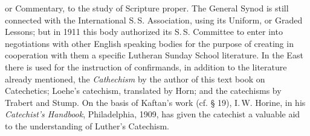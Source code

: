 or Commentary, to the study of Scripture proper. The General Synod is still connected with the International S.\,S. Association, using its Uniform, or Graded Lessons; but in 1911 this body authorized its S.\,S. Committee to enter into negotiations with other English speaking bodies for the purpose of creating in cooperation with them a specific Lutheran Sunday School literature. In the East there is used for the instruction of confirmands, in addition to the literature already mentioned, the \emph{Cathechism} by the author of this text book on Catechetics; Loehe’s catechism, translated by Horn; and the catechisms by Trabert and Stump. On the basis of Kaftan’s work (cf. § 19), I.\,W. Horine, in his \emph{Catechist’s Handbook}, Philadelphia, 1909, has given the catechist a valuable aid to the understanding of Luther’s Catechism.

